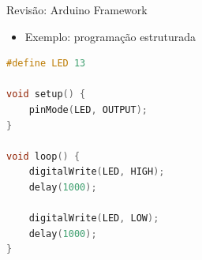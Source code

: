 \begin{frame}[fragile]{Revisão: Arduino Framework}
    \begin{itemize}
        \item Exemplo: programação estruturada
    \end{itemize}

\begin{lstlisting}[language=C++,basicstyle=\ttfamily\scriptsize]
#define LED 13

void setup() {
    pinMode(LED, OUTPUT);
}

void loop() {
    digitalWrite(LED, HIGH);
    delay(1000);

    digitalWrite(LED, LOW);
    delay(1000);
}
\end{lstlisting}
\end{frame}
